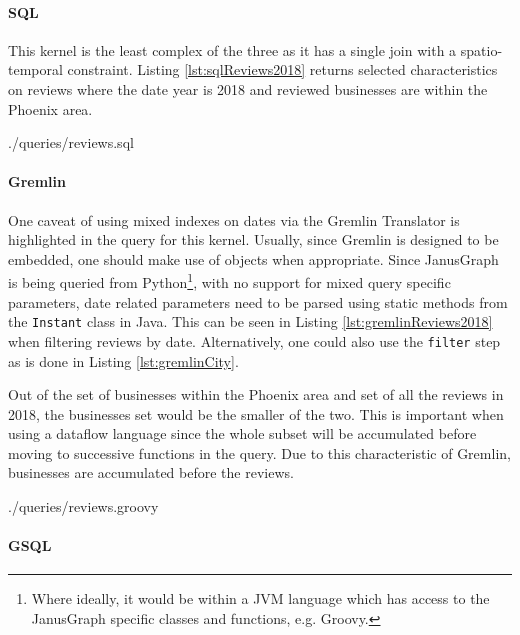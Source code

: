 \paragraph{SQL}

This kernel is the least complex of the three as it has a single join with a spatio-temporal constraint. Listing \ref{lst:sqlReviews2018} returns selected characteristics on reviews where the date year is 2018 and reviewed businesses are within the Phoenix area.


{./queries/reviews.sql}

\paragraph{Gremlin}

One caveat of using mixed indexes on dates via the Gremlin Translator is highlighted in the query for this kernel. Usually, since Gremlin is designed to be embedded, one should make use of objects when appropriate. Since JanusGraph is being queried from Python\footnote{Where ideally, it would be within a JVM language which has access to the JanusGraph specific classes and functions, e.g. Groovy.}, with no support for mixed query specific parameters, date related parameters need to be parsed using static methods from the \texttt{Instant} class in Java. This can be seen in Listing \ref{lst:gremlinReviews2018} when filtering reviews by date. Alternatively, one could also use the \texttt{filter} step as is done in Listing \ref{lst:gremlinCity}.

Out of the set of businesses within the Phoenix area and set of all the reviews in 2018, the businesses set would be the smaller of the two. This is important when using a dataflow language since the whole subset will be accumulated before moving to successive functions in the query. Due to this characteristic of Gremlin, businesses are accumulated before the reviews.


{./queries/reviews.groovy}

\paragraph{GSQL}

